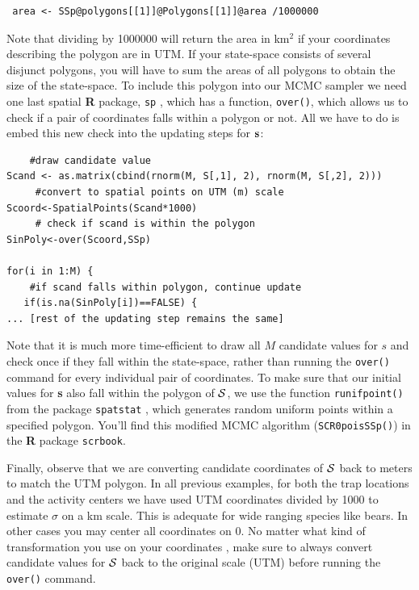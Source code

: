 \begin{verbatim}
 area <- SSp@polygons[[1]]@Polygons[[1]]@area /1000000
\end{verbatim}

 Note that dividing by 1000000 will return the area in km$^2$ if your coordinates describing the polygon are in UTM. If your state-space consists of several disjunct polygons, you will have to sum the areas of all polygons to obtain the size of the state-space.
To include this polygon into our MCMC sampler we need one last spatial 
{\bf R} package, \mbox{\tt sp} \citep{pebesma_bivand:2011}, which has a 
function, \verb#over()#, which allows us to check if a pair of coordinates 
falls within a polygon or not. All we have to do is embed this new check 
into the updating steps for ${\bf s}$:
\begin{verbatim}
    #draw candidate value
Scand <- as.matrix(cbind(rnorm(M, S[,1], 2), rnorm(M, S[,2], 2)))
     #convert to spatial points on UTM (m) scale
Scoord<-SpatialPoints(Scand*1000)   
     # check if scand is within the polygon
SinPoly<-over(Scoord,SSp)		

for(i in 1:M) {
    #if scand falls within polygon, continue update
   if(is.na(SinPoly[i])==FALSE) {		
... [rest of the updating step remains the same]
\end{verbatim}
Note that it is much more time-efficient to draw all $M$ candidate values 
for $s$ and check once if they fall within the state-space, rather than 
running the \verb#over()# command for every individual pair of 
coordinates. To make sure that our initial values for {\bf s} also fall 
within the polygon of ${\cal S}$, we use the function \verb#runifpoint()# 
from the package \mbox{\tt spatstat} \citep{baddeley_turner:2005}, 
which generates random uniform points within a specified polygon. You'll 
find this modified MCMC algorithm (\mbox{\tt SCR0poisSSp()}) in the {\bf R} 
package \mbox{\tt scrbook}.

Finally, observe that we are converting candidate coordinates of ${\cal S}$ 
back to meters to match the UTM polygon. In all previous examples, 
for both the trap locations and the activity centers we have used UTM 
coordinates divided by 1000 to estimate $\sigma$ on a km scale. This is 
adequate for wide ranging species like bears. In other cases you 
may center all coordinates on 0. No matter what kind of transformation you 
use on your coordinates , make sure to always convert candidate values for 
${\cal S}$ back to the original scale (UTM) before running the 
\verb#over()# command.

